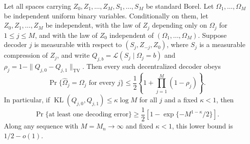 Let all spaces carrying \(Z_0,Z_1,\ldots,Z_M,S_1,\ldots,S_M\) be standard Borel.  Let \(\Omega_1,\ldots,\Omega_M\) be independent uniform binary variables.  Conditionally on them, let \(Z_0,Z_1,\ldots,Z_M\) be independent, with the law of \(Z_j\) depending only on \(\Omega_j\) for \(1\leq j\leq M\), and with the law of \(Z_0\) independent of \((\Omega_1,\ldots,\Omega_M)\).  Suppose decoder \(j\) is measurable with respect to \((S_j,Z_{-j},Z_0)\), where \(S_j\) is a measurable compression of \(Z_j\), and write \(Q_{j,b}=\mathcal L(S_j\mid\Omega_j=b)\) and \(\rho_j=1-\|Q_{j,0}-Q_{j,1}\|_{\mathrm{TV}}\).  Then every such decentralized decoder obeys
\[
 \Pr\{\widehat\Omega_j=\Omega_j\text{ for every }j\}
 \leq\frac12\left\{1+\prod_{j=1}^M(1-\rho_j)\right\}.
\]
In particular, if \(\operatorname{KL}(Q_{j,0},Q_{j,1})\leq\kappa\log M\) for all \(j\) and a fixed \(\kappa<1\), then
\[
 \Pr\{\text{at least one decoding error}\}
 \geq\frac12\left[1-\exp\{-M^{1-\kappa}/2\}\right].
\]
Along any sequence with \(M=M_n\to\infty\) and fixed \(\kappa<1\), this lower bound is \(1/2-o(1)\).